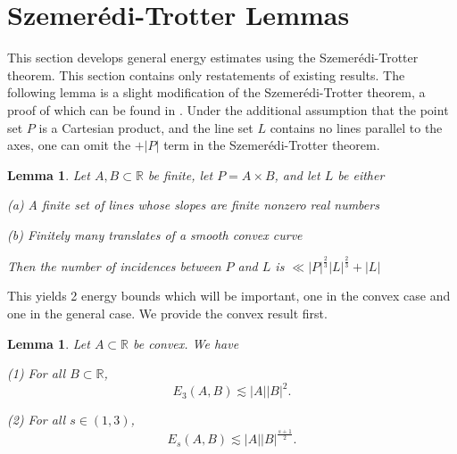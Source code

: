 \documentclass[reqno]{amsart}
\newcommand{\szemeredi}{Szemer{\'e}di}
\numberwithin{equation}{section}
\newtheorem{lemma}[theorem]{Lemma}
\begin{document}
\bigskip

\section{\szemeredi-Trotter Lemmas}\label{section:SzT}
This section develops general energy estimates using the \szemeredi-Trotter theorem.
This section contains only restatements of existing results.
The following lemma is a slight modification of the \szemeredi-Trotter theorem, a proof
of which can be found in \cite{solymosi-szt}. Under the additional assumption that the point set
\(P\) is a Cartesian product, and the line set \(L\) contains no lines parallel to the axes,
one can omit the \(+ \left\lvert P \right\rvert \) term in the \szemeredi-Trotter theorem.

\begin{lemma}\label{lem:solymosi-szt}    
Let \(A,B \subset \mathbb{R}\) be finite, let \(P = A \times B\), and let \(L\) be either

(a) A finite set of lines whose slopes are finite nonzero real numbers

(b) Finitely many translates of a smooth convex curve

Then the number of incidences between \(P\) and \(L\) is \(\ll \left\lvert P \right\rvert ^{\frac{2}{3} }\left\lvert L \right\rvert ^{\frac{2}{3} } + \left\lvert L \right\rvert     \)
\end{lemma}

This yields 2 energy bounds which will be important, one in the convex case and one in the general case.
We provide the convex result first.

\begin{lemma}\label{lem:convex-szt}
Let \(A \subset \mathbb{R} \) be convex. We have

(1) For all \(B \subset \mathbb{R} \),
\[
    E_3(A,B)\lesssim \left\lvert A \right\rvert \left\lvert B \right\rvert ^{2}
.\]

(2) For all \(s \in (1,3)\),
\[
    E_{s} (A,B) \lesssim \left\lvert A \right\rvert \left\lvert B \right\rvert ^{\frac{s+ 1}{2} }
.\]
\end{lemma}
\end{document}
